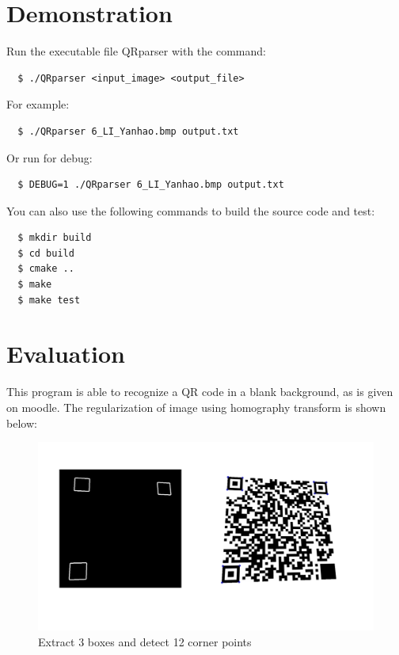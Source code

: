 \documentclass[10pt]{article}
\begin{document}
\section{Demonstration}

\noindent Run the executable file QRparser with the command:
\begin{verbatim}
  $ ./QRparser <input_image> <output_file>
\end{verbatim}

\noindent For example: 
\begin{verbatim}
  $ ./QRparser 6_LI_Yanhao.bmp output.txt
\end{verbatim}

\noindent Or run for debug:
\begin{verbatim}
  $ DEBUG=1 ./QRparser 6_LI_Yanhao.bmp output.txt
\end{verbatim}


\noindent You can also use the following commands to build the source code and test:
\begin{verbatim}
  $ mkdir build 
  $ cd build
  $ cmake ..
  $ make
  $ make test
\end{verbatim}


\section{Evaluation}

This program is able to recognize a QR code in a blank background, as is given on moodle. The 
regularization of image using homography transform is shown below: 


\begin{figure}[H]
  \centering
  \includegraphics[width=\linewidth]{pic-05.png}
  \caption{Extract 3 boxes and detect 12 corner points}
\end{figure}
\end{document}
